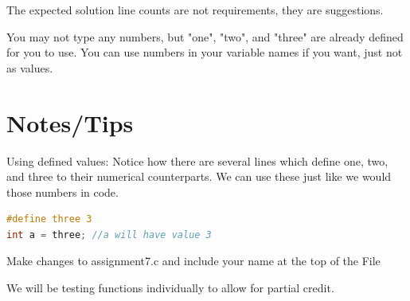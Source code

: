 \documentclass[12pt]{article}
\begin{document}
The expected solution line counts are not requirements, they are suggestions.

You may not type any numbers, but "one", "two", and "three" are already defined for you to use. You can use numbers in your variable names if you want, just not as values.

\section{Notes/Tips}
Using defined values:
Notice how there are several lines which define one, two, and three to their numerical counterparts.
We can use these just like we would those numbers in code.

\begin{lstlisting}[language=C]
#define three 3
int a = three; //a will have value 3
\end{lstlisting}
Make changes to assignment7.c and include your name at the top of the File

We will be testing functions individually to allow for partial credit.
\end{document}
